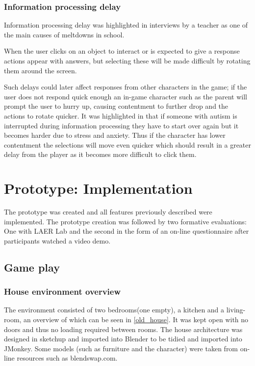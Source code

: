 \documentclass[11pt]{report}
\begin{document}
\subsection{Information processing delay}
Information processing delay was highlighted in interviews by a teacher as one of the main causes of meltdowns in school. 

When the user clicks on an object to interact or is expected to give a response actions appear with answers, but selecting these will be made difficult by rotating them around the screen. 

Such delays could later affect responses from other characters in the game; if the user does not respond quick enough an in-game character such as the parent will prompt the user to hurry up, causing contentment to further drop and the actions to rotate quicker. It was highlighted in \cite{olgab} that if someone with autism is interrupted during information processing they have to start over again but it becomes harder due to stress and anxiety. Thus if the character has lower contentment the selections will move even quicker which should result in a greater delay from the player as it becomes more difficult to click them. 

\chapter{Prototype: Implementation}
The prototype was created and all features previously described were implemented. The prototype creation was followed by two formative evaluations: One with LAER Lab and the second in the form of an on-line questionnaire after participants watched a video demo. 

\section{Game play}

\subsection*{House environment overview}
The environment consisted of two bedrooms(one empty), a kitchen and a living-room, an overview of which can be seen in \ref{old_house}. It was kept open with no doors and thus no loading required between rooms. The house architecture was designed in sketchup and imported into Blender to be tidied and imported into JMonkey. Some models (such as furniture and the character) were taken from on-line resources such as blendswap.com.  
\end{document}
